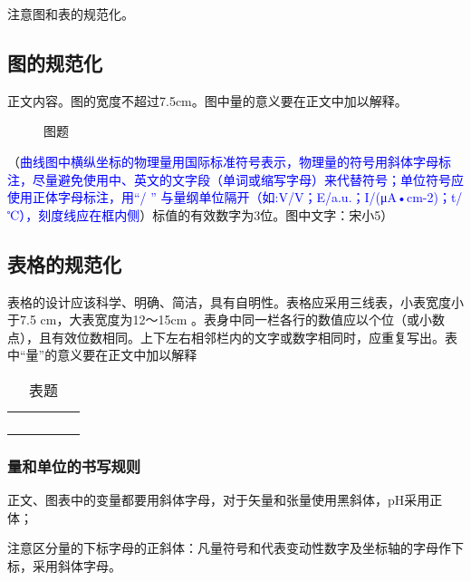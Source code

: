 \documentclass[a4paper]{ctexart}
\begin{document}
\begin{multicols}{2}
    注意图和表的规范化。
    \subsection{图的规范化}

    正文内容。图的宽度不超过7.5cm。图中量的意义要在正文中加以解释。

    \begin{figure}[H]
        \centering
        \fbox{\rule{0pt}{5cm} \rule{7.5cm}{0pt}}
        \caption{图题}
        \label{fig:one_col}
    \end{figure}

    （\textcolor{blue}{曲线图中横纵坐标的物理量用国际标准符号表示，物理量的符号用斜体字母标注，尽量避免使用中、英文的文字段（单词或缩写字母）来代替符号；单位符号应使用正体字母标注，用“/ ” 与量纲单位隔开（如:V/V；E/a.u.；I/(μA•cm-2)；t/℃），刻度线应在框内侧}）标值的有效数字为3位。图中文字：宋小5）

    \subsection{表格的规范化}

    表格的设计应该科学、明确、简洁，具有自明性。表格应采用三线表，小表宽度小于7.5 cm，大表宽度为12～15cm 。表身中同一栏各行的数值应以个位（或小数点），且有效位数相同。上下左右相邻栏内的文字或数字相同时，应重复写出。表中“量”的意义要在正文中加以解释

    \begin{table}[H]
        \centering
        \caption{表题}
        \label{tab:one_col}
        \begin{tabular*}{7.5cm}{ccccc}
            \toprule
            \\
            \midrule
            \\
            \\
            \\
            \\
            \bottomrule
        \end{tabular*}
    \end{table}

    \subsubsection{量和单位的书写规则}

    正文、图表中的变量都要用斜体字母，对于矢量和张量使用黑斜体，pH采用正体；

    注意区分量的下标字母的正斜体：凡量符号和代表变动性数字及坐标轴的字母作下标，采用斜体字母。


\end{multicols}
\end{document}
